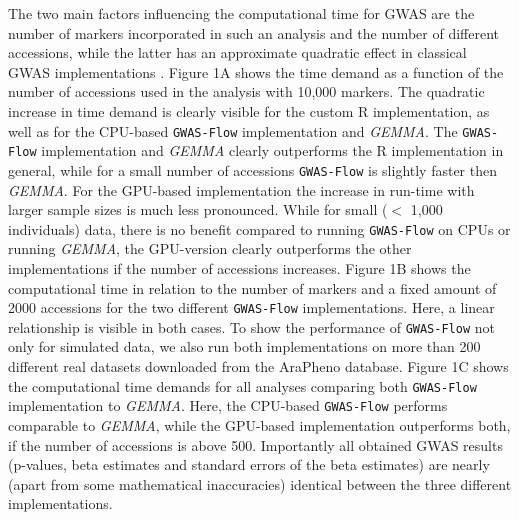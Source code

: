 The two main factors influencing the computational time for GWAS are the number of markers incorporated in such an analysis and the number of different accessions, while the latter has an approximate quadratic effect in classical GWAS implementations \cite{Zhou2012}.  
Figure 1A shows the time demand as a function of the number of accessions used in the analysis with 10,000 markers. The quadratic increase in time demand is clearly visible for the custom R implementation, as well as for the CPU-based \texttt{GWAS-Flow} implementation and \textit{GEMMA}. The \texttt{GWAS-Flow} implementation and \textit{GEMMA} clearly outperforms the R implementation in general, while for a small number of accessions \texttt{GWAS-Flow} is slightly faster then \textit{GEMMA}. For the GPU-based implementation the increase in run-time with larger sample sizes is much less pronounced. While for small ($<$ 1,000 individuals) data, there is no benefit compared to running \texttt{GWAS-Flow} on CPUs or running \textit{GEMMA}, the GPU-version clearly outperforms the other implementations if the number of accessions increases. Figure 1B shows the computational time in relation to the number of markers and a fixed amount of 2000 accessions for the two different \texttt{GWAS-Flow} implementations. Here, a linear relationship is visible in both cases.
To show the performance of \texttt{GWAS-Flow} not only for simulated data, we also run both implementations on more than 200 different real datasets downloaded from the AraPheno database. Figure 1C shows the computational time demands for all analyses comparing both \texttt{GWAS-Flow} implementation to \textit{GEMMA}. Here, the CPU-based \texttt{GWAS-Flow} performs comparable to \textit{GEMMA}, while the GPU-based implementation outperforms both, if the number of accessions is above 500. Importantly all obtained GWAS results (p-values, beta estimates and standard errors of the beta estimates) are nearly (apart from some mathematical inaccuracies) identical between the three different implementations.
